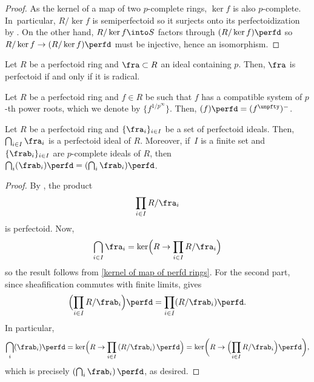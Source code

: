 \begin{proof}
As the kernel of a map of two $p$-complete rings, $\ker f$ is also $p$-complete. In~particular, $R/\ker f$ is semiperfectoid so it surjects onto its perfectoidization by \cite[Th.\,7.4]{BhattScholzePrisms}. On the other hand, $R/\ker f\into S$ factors through $(R/\ker f)\perfd$ so $R/\ker f\to (R/\ker f)\perfd$ must be injective, hence an isomorphism.
\end{proof}

\begin{proposition}\label{perfectoidization is radical when p in ideal}
Let $R$ be a perfectoid ring and $\fra\subset R$ an ideal containing $p$. Then, $\fra$ is perfectoid if and only if it is radical.
\end{proposition}

\begin{proposition}\label{perfectoidization of principal ideal with roots}
Let $R$ be a perfectoid ring and $f\in R$ be such that $f$ has a compatible system of $p$-th power roots, which we denote by $\{f^{1/{p^\infty}}\}$. Then, $(f)\perfd=(f^\unpfty)^{-}$.
\end{proposition}

\begin{proposition}\label{intersection of perfectoid ideals is perfectoid}
Let $R$ be a perfectoid ring and $\{\fra_i\}_{i\in I}$ be a set of perfectoid ideals. Then, $\bigcap_{i\in I} \fra_i$ is a perfectoid ideal of $R$.
Moreover, if~$I$ is a finite set and $\{\frab_i\}_{i\in I}$ are $p$-complete ideals of $R$, then $\bigcap_i (\frab_i)\perfd=(\bigcap_i \frab_i)\perfd$.
\end{proposition}

\begin{proof}
By \cite[Ex.\,3.8\,(8)]{BhattIyengarMaRegularRings}, the product
\[
\prod_{i\in I}R/\fra_i
\]
is perfectoid. Now,
\[
\bigcap_{i\in I} \fra_i=\ker \Bigl( R\to \prod_{i\in I}R/\fra_i\Bigr)
\]
so the result follows from \autoref{kernel of map of perfd rings}.
For the second part, since sheafification commutes with finite limits, \cite[Cor.\,8.11]{BhattScholzePrisms} gives
\[
\Bigl(\prod_{i\in I} R/\frab_i\Bigr)\perfd=\prod_{i\in I}( R/\frab_i)\perfd.
\]
In particular,
\[
\bigcap_i (\frab_i)\perfd=\ker\Bigl( R\to \prod_{i\in I} \left( R/\frab_i\right)\perfd \Bigr)= \ker \biggl( R\to \Bigl(\prod_{i\in I} R/\frab_i\Bigr)\perfd\biggr),
\]
which is precisely $\left(\bigcap_i \frab_i\right)\perfd$, as desired.
\end{proof}

